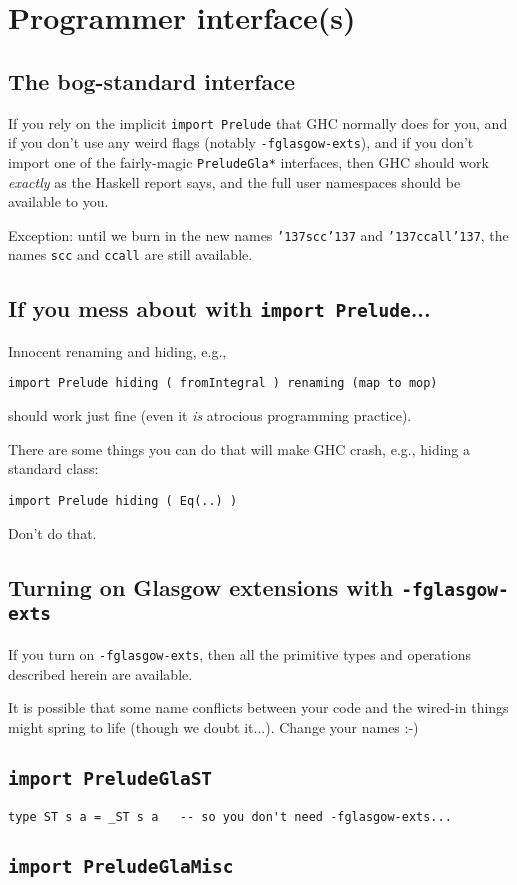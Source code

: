 \section{Programmer interface(s)}

\subsection{The bog-standard interface}

If you rely on the implicit \mbox{\tt import\ Prelude} that GHC normally does
for you, and if you don't use any weird flags (notably
\mbox{\tt -fglasgow-exts}), and if you don't import one of the fairly-magic
\mbox{\tt PreludeGla*} interfaces, then GHC should work {\em exactly} as the
Haskell report says, and the full user namespaces should be available
to you.

Exception: until we burn in the new names \mbox{\tt {\char'137}scc{\char'137}} and \mbox{\tt {\char'137}ccall{\char'137}}, the
names \mbox{\tt scc} and \mbox{\tt ccall} are still available.

\subsection{If you mess about with \mbox{\tt import\ Prelude}...}

Innocent renaming and hiding, e.g.,
\begin{verbatim}
import Prelude hiding ( fromIntegral ) renaming (map to mop)
\end{verbatim}
should work just fine (even it {\em is} atrocious programming practice).

There are some things you can do that will make GHC crash, e.g.,
hiding a standard class:
\begin{verbatim}
import Prelude hiding ( Eq(..) )
\end{verbatim}
Don't do that.

\subsection{Turning on Glasgow extensions with \mbox{\tt -fglasgow-exts}}

If you turn on \mbox{\tt -fglasgow-exts}, then all the primitive types and
operations described herein are available.

It is possible that some name conflicts between your code and the
wired-in things might spring to life (though we doubt it...).
Change your names :-)

\subsection{\mbox{\tt import\ PreludeGlaST}}

\begin{verbatim}
type ST s a = _ST s a   -- so you don't need -fglasgow-exts...
\end{verbatim}

\subsection{\mbox{\tt import\ PreludeGlaMisc}}


                                                        
